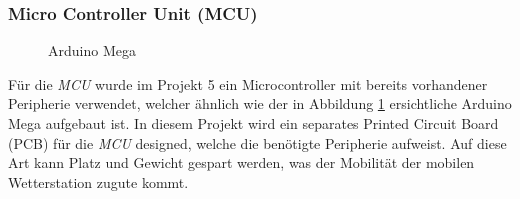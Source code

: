 \subsubsection{Micro Controller Unit (MCU)}
\begin{figure}
  \vspace{-10pt}
  \begin{center}
  \end{center}
  \vspace{-10pt}
  \caption{Arduino Mega \cite{Elektronik}}
  \vspace{-10pt}
  \label{fig:arduino_mega}
\end{figure}
Für die \textit{MCU} wurde im Projekt 5 ein Microcontroller mit bereits vorhandener Peripherie verwendet, welcher ähnlich wie der in Abbildung \ref{fig:arduino_mega} ersichtliche Arduino Mega aufgebaut ist. In diesem Projekt wird ein separates Printed Circuit Board (PCB) für die \textit{MCU} designed, welche die benötigte Peripherie aufweist. Auf diese Art kann Platz und Gewicht gespart werden, was der Mobilität der mobilen Wetterstation zugute kommt.\\

